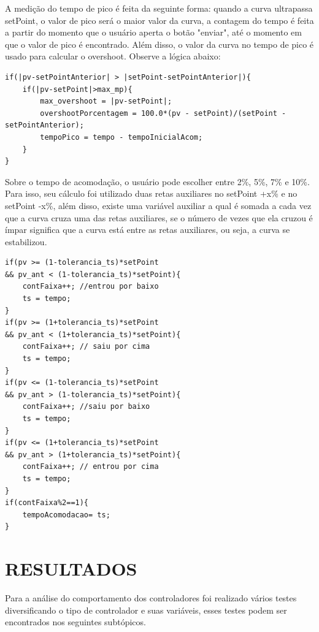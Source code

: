 \documentclass[a4paper,12pt]{article}
\begin{document}
\hspace{4ex}A medição do tempo de pico é feita da seguinte forma: quando a curva ultrapassa setPoint, o valor de pico será o maior valor da curva, a contagem do tempo é feita a partir do momento que o usuário aperta o botão "enviar", até o momento em que o valor de pico é encontrado. Além disso, o valor da curva no tempo de pico é usado para calcular o overshoot. Observe a lógica abaixo:

\begin{lstlisting}
if(|pv-setPointAnterior| > |setPoint-setPointAnterior|){
	if(|pv-setPoint|>max_mp){
		max_overshoot = |pv-setPoint|;
		overshootPorcentagem = 100.0*(pv - setPoint)/(setPoint - setPointAnterior);
		tempoPico = tempo - tempoInicialAcom;
	}
}
\end{lstlisting}

\hspace{4ex}Sobre o tempo de acomodação, o usuário pode escolher entre 2\%, 5\%, 7\% e 10\%. Para isso, seu cálculo foi utilizado duas retas auxiliares no setPoint +x\% e no setPoint -x\%, além disso, existe uma variável auxiliar a qual é somada a cada vez que a curva cruza uma das retas auxiliares, se o número de vezes que ela cruzou é ímpar significa que a curva está entre as retas auxiliares, ou seja, a curva se estabilizou.

\begin{lstlisting}
if(pv >= (1-tolerancia_ts)*setPoint
&& pv_ant < (1-tolerancia_ts)*setPoint){
	contFaixa++; //entrou por baixo
	ts = tempo;
}
if(pv >= (1+tolerancia_ts)*setPoint
&& pv_ant < (1+tolerancia_ts)*setPoint){
	contFaixa++; // saiu por cima
	ts = tempo;
}
if(pv <= (1-tolerancia_ts)*setPoint
&& pv_ant > (1-tolerancia_ts)*setPoint){
	contFaixa++; //saiu por baixo
	ts = tempo;
}
if(pv <= (1+tolerancia_ts)*setPoint
&& pv_ant > (1+tolerancia_ts)*setPoint){
	contFaixa++; // entrou por cima
	ts = tempo;
}
if(contFaixa%2==1){
	tempoAcomodacao= ts;
}
\end{lstlisting}

\newpage


\thispagestyle{main}

\section{RESULTADOS}

\hspace{4ex}Para a análise do comportamento dos controladores foi realizado vários testes diversificando o tipo de controlador e suas variáveis, esses testes podem ser encontrados nos seguintes subtópicos.
\end{document}
